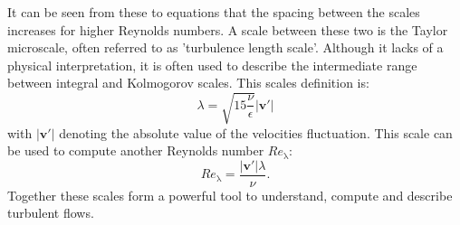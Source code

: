 \documentclass[11pt,a4paper,openany,oneside,parskip=half*]{article}
\renewcommand*\vec[1]{\boldsymbol{#1}}
\begin{document}
It can be seen from these to equations that the spacing between the scales increases for higher Reynolds numbers. 
\newline
A scale between these two is the Taylor microscale, often referred to as 'turbulence length scale'. 
Although it lacks of a physical interpretation, it is often used to describe the intermediate range between integral and Kolmogorov scales. 
This scales definition is: 
\begin{equation}
\lambda = \sqrt{15 \frac{\nu}{\epsilon}} |\vec{v'}|
\end{equation}
with $|\vec{v'}|$ denoting the absolute value of the velocities fluctuation. This scale can be used to compute another Reynolds number $Re_\mathrm{\lambda}$:
\begin{equation}
Re_\mathrm{\lambda} = \frac{|\vec{v'}| \lambda}{\nu}.
\end{equation}
Together these scales form a powerful tool to understand, compute and describe turbulent flows. 
\pagebreak
\end{document}
